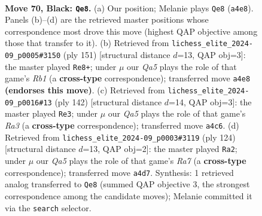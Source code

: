\documentclass[11pt]{article}
\begin{document}
\clearpage

\begin{figure}[p]\centering
\begin{subfigure}{0.46\textwidth}\centering
\resizebox{\linewidth}{!}{%
\newchessgame
\chessboard[
  setfen={8/8/8/7R/qp6/3k1B2/1b6/5K2 b - - 31 70},
  showmover=false,
  pgfstyle=straightmove, color=movearrow, markmove={a4-e8}
]}
\caption{}
\end{subfigure}\hfill
\begin{subfigure}{0.46\textwidth}\centering
\resizebox{\linewidth}{!}{%
\newchessgame
\chessboard[
  setfen={1r6/8/4K3/7k/4B3/8/6R1/8 b - - 2 76},
  showmover=false,
  pgfstyle=straightmove, color=movearrow, markmove={b8-e8}
]}
\caption{}
\end{subfigure}
\\[4pt]
\begin{subfigure}{0.46\textwidth}\centering
\resizebox{\linewidth}{!}{%
\newchessgame
\chessboard[
  setfen={8/8/8/8/2k1b3/R7/6r1/2K5 w - - 40 72},
  showmover=false,
  pgfstyle=straightmove, color=movearrow, markmove={a3-e3}
]}
\caption{}
\end{subfigure}\hfill
\begin{subfigure}{0.46\textwidth}\centering
\resizebox{\linewidth}{!}{%
\newchessgame
\chessboard[
  setfen={8/R7/7k/4b3/5r2/8/6K1/8 w - - 0 63},
  showmover=false,
  pgfstyle=straightmove, color=movearrow, markmove={a7-a2}
]}
\caption{}
\end{subfigure}
\caption{\textbf{Move 70, Black: \texttt{Qe8}.} (a) Our position; Melanie plays \texttt{Qe8} (\texttt{a4e8}). Panels (b)--(d) are the retrieved master positions whose correspondence most drove this move (highest QAP objective among those that transfer to it). (b) Retrieved from \texttt{lichess\_elite\_2024-09\_p0005\#3150} (ply 151) [structural distance $d$=13, QAP obj=3]: the master played \texttt{Re8+}; under $\mu$ our \emph{Qa5} plays the role of that game's \emph{Rb1} (a \textbf{cross-type} correspondence); transferred move \texttt{a4e8} \textbf{(endorses this move)}. (c) Retrieved from \texttt{lichess\_elite\_2024-09\_p0016\#13} (ply 142) [structural distance $d$=14, QAP obj=3]: the master played \texttt{Re3}; under $\mu$ our \emph{Qa5} plays the role of that game's \emph{Ra3} (a \textbf{cross-type} correspondence); transferred move \texttt{a4c6}. (d) Retrieved from \texttt{lichess\_elite\_2024-09\_p0003\#3119} (ply 124) [structural distance $d$=13, QAP obj=2]: the master played \texttt{Ra2}; under $\mu$ our \emph{Qa5} plays the role of that game's \emph{Ra7} (a \textbf{cross-type} correspondence); transferred move \texttt{a4d7}. Synthesis: 1 retrieved analog transferred to \texttt{Qe8} (summed QAP objective 3, the strongest correspondence among the candidate moves); Melanie committed it via the \texttt{search} selector.}
\label{fig:thought-m139}
\end{figure}
\end{document}
